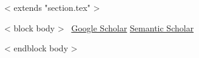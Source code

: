 ~< extends "section.tex" >~

~< block body >~
\vspace{-8mm}
\hfill
\href{https://scholar.google.com/citations?user=<< scholar_id >>}{Google Scholar}
\href{https://www.semanticscholar.org/author/<< semantic_id >>}{Semantic Scholar}
\vspace{2mm}

\renewcommand*{\bibfont}{\small}

\begin{refsection}
\nocite{*}
\printbibliography[heading=none] %
\end{refsection}

~< endblock body >~
